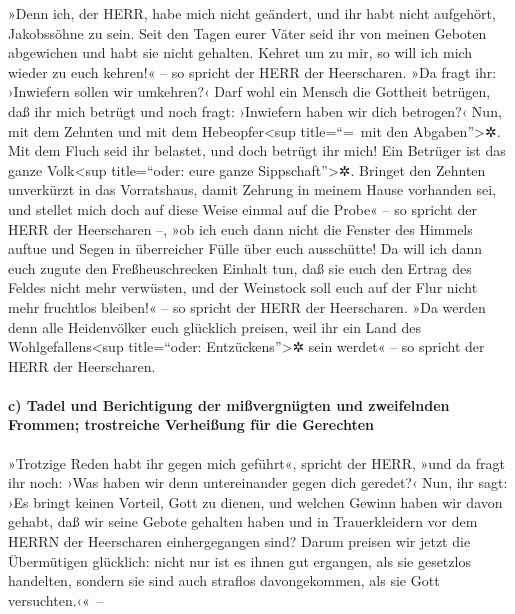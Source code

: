  »Denn ich, der HERR, habe mich nicht geändert, und ihr
habt nicht aufgehört, Jakobssöhne zu sein.  Seit den Tagen
eurer Väter seid ihr von meinen Geboten abgewichen und habt sie nicht
gehalten. Kehret um zu mir, so will ich mich wieder zu euch kehren!« --
so spricht der HERR der Heerscharen. »Da fragt ihr: ›Inwiefern sollen
wir umkehren?‹  Darf wohl ein Mensch die Gottheit
betrügen, daß ihr mich betrügt und noch fragt: ›Inwiefern haben wir dich
betrogen?‹ Nun, mit dem Zehnten und mit dem Hebeopfer\textless sup
title=``=~mit den Abgaben''\textgreater✲.  Mit dem Fluch
seid ihr belastet, und doch betrügt ihr mich! Ein Betrüger ist das ganze
Volk\textless sup title=``oder: eure ganze Sippschaft''\textgreater✲.
 Bringet den Zehnten unverkürzt in das Vorratshaus, damit
Zehrung in meinem Hause vorhanden sei, und stellet mich doch auf diese
Weise einmal auf die Probe« -- so spricht der HERR der Heerscharen --,
»ob ich euch dann nicht die Fenster des Himmels auftue und Segen in
überreicher Fülle über euch ausschütte!  Da will ich dann
euch zugute den Freßheuschrecken Einhalt tun, daß sie euch den Ertrag
des Feldes nicht mehr verwüsten, und der Weinstock soll euch auf der
Flur nicht mehr fruchtlos bleiben!« -- so spricht der HERR der
Heerscharen.  »Da werden denn alle Heidenvölker euch
glücklich preisen, weil ihr ein Land des Wohlgefallens\textless sup
title=``oder: Entzückens''\textgreater✲ sein werdet« -- so spricht der
HERR der Heerscharen.

\hypertarget{c-tadel-und-berichtigung-der-miuxdfvergnuxfcgten-und-zweifelnden-frommen-trostreiche-verheiuxdfung-fuxfcr-die-gerechten}{%
\paragraph{c) Tadel und Berichtigung der mißvergnügten und zweifelnden
Frommen; trostreiche Verheißung für die
Gerechten}\label{c-tadel-und-berichtigung-der-miuxdfvergnuxfcgten-und-zweifelnden-frommen-trostreiche-verheiuxdfung-fuxfcr-die-gerechten}}

 »Trotzige Reden habt ihr gegen mich geführt«, spricht
der HERR, »und da fragt ihr noch: ›Was haben wir denn untereinander
gegen dich geredet?‹  Nun, ihr sagt: ›Es bringt keinen
Vorteil, Gott zu dienen, und welchen Gewinn haben wir davon gehabt, daß
wir seine Gebote gehalten haben und in Trauerkleidern vor dem HERRN der
Heerscharen einhergegangen sind?  Darum preisen wir jetzt
die Übermütigen glücklich: nicht nur ist es ihnen gut ergangen, als sie
gesetzlos handelten, sondern sie sind auch straflos davongekommen, als
sie Gott versuchten.‹«~--

